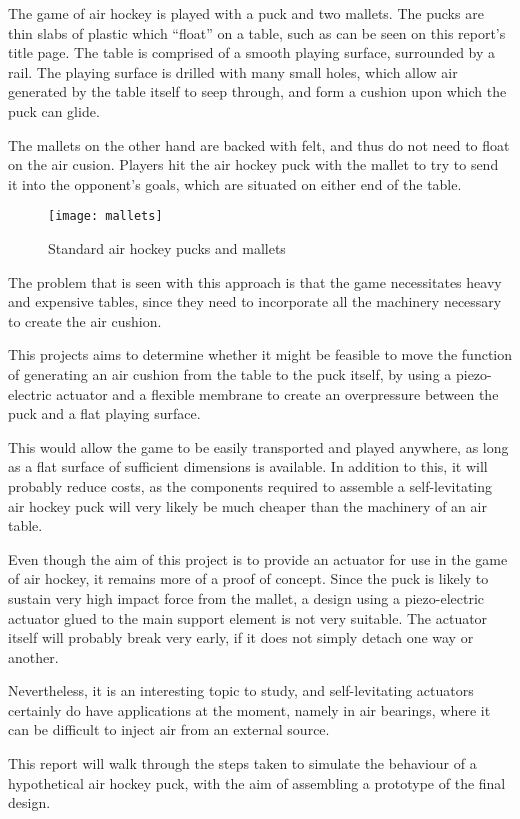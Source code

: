 The game of air hockey is played with a puck and two mallets. The pucks are
thin slabs of plastic which ``float'' on a table, such as can be seen on this
report's title page. The table is comprised of a smooth playing surface,
surrounded by a rail. The playing surface is drilled with many small holes,
which allow air generated by the table itself to seep through, and form a
cushion upon which the puck can glide.

The mallets on the other hand are backed with felt, and thus do not need to
float on the air cusion. Players hit the air hockey puck with the mallet to try
to send it into the opponent's goals, which are situated on either end of the
table.

\begin{figure}[h]
  \begin{center}
    \texttt{[image: mallets]}
  \end{center}
  \caption{Standard air hockey pucks and mallets}
  \label{fig:mallets}
\end{figure}

The problem that is seen with this approach is that the game necessitates heavy
and expensive tables, since they need to incorporate all the machinery necessary
to create the air cushion.

This projects aims to determine whether it might be feasible to move the
function of generating an air cushion from the table to the puck itself, by
using a piezo-electric actuator and a flexible membrane to create an
overpressure between the puck and a flat playing surface.

This would allow the game to be easily transported and played anywhere, as long
as a flat surface of sufficient dimensions is available. In addition to this, it
will probably reduce costs, as the components required to assemble a
self-levitating air hockey puck will very likely be much cheaper than the
machinery of an air table.

\asterbreak

Even though the aim of this project is to provide an actuator for use in the
game of air hockey, it remains more of a proof of concept. Since the puck is
likely to sustain very high impact force from the mallet, a design using a
piezo-electric actuator glued to the main support element is not very suitable.
The actuator itself will probably break very early, if it does not simply detach
one way or another.

Nevertheless, it is an interesting topic to study, and self-levitating actuators
certainly do have applications at the moment, namely in air bearings, where it
can be difficult to inject air from an external source.

This report will walk through the steps taken to simulate the behaviour of a
hypothetical air hockey puck, with the aim of assembling a prototype of the
final design.
